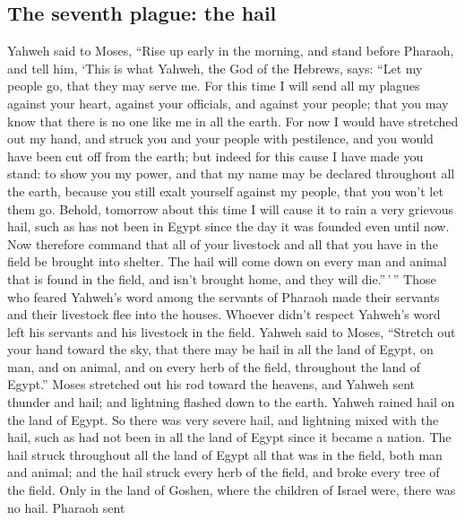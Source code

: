 \hypertarget{the-seventh-plague-the-hail}{%
\subsection{The seventh plague: the
hail}\label{the-seventh-plague-the-hail}}

 Yahweh said to Moses, ``Rise up early in the morning,
and stand before Pharaoh, and tell him, `This is what Yahweh, the God of
the Hebrews, says: ``Let my people go, that they may serve me.
 For this time I will send all my plagues against your
heart, against your officials, and against your people; that you may
know that there is no one like me in all the earth.  For
now I would have stretched out my hand, and struck you and your people
with pestilence, and you would have been cut off from the earth;
 but indeed for this cause I have made you stand: to show
you my power, and that my name may be declared throughout all the earth,
 because you still exalt yourself against my people, that
you won't let them go.  Behold, tomorrow about this time
I will cause it to rain a very grievous hail, such as has not been in
Egypt since the day it was founded even until now.  Now
therefore command that all of your livestock and all that you have in
the field be brought into shelter. The hail will come down on every man
and animal that is found in the field, and isn't brought home, and they
will die.''\,'\,''  Those who feared Yahweh's word among
the servants of Pharaoh made their servants and their livestock flee
into the houses.  Whoever didn't respect Yahweh's word
left his servants and his livestock in the field.  Yahweh
said to Moses, ``Stretch out your hand toward the sky, that there may be
hail in all the land of Egypt, on man, and on animal, and on every herb
of the field, throughout the land of Egypt.''  Moses
stretched out his rod toward the heavens, and Yahweh sent thunder and
hail; and lightning flashed down to the earth. Yahweh rained hail on the
land of Egypt.  So there was very severe hail, and
lightning mixed with the hail, such as had not been in all the land of
Egypt since it became a nation.  The hail struck
throughout all the land of Egypt all that was in the field, both man and
animal; and the hail struck every herb of the field, and broke every
tree of the field.  Only in the land of Goshen, where the
children of Israel were, there was no hail.  Pharaoh sent
